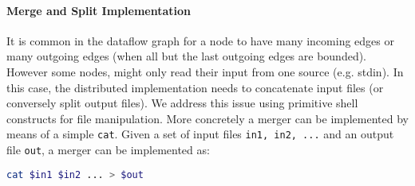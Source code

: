 \documentclass[acmsmall,10pt,review,anonymous]{acmart}
\newcommand{\ttt}[1]{\texttt{\small #1}}
\newcommand{\nv}[1]{[{\color{cyan}#1 --- nv}]}
\newcommand{\kk}[1]{[{\color{magenta}#1 --- kk}]}
\newcommand{\tr}[1]{} %
\begin{document}
% 
% 
% 
% 
% 
%

\paragraph{Merge and Split Implementation}
%
It is common in the dataflow graph for a node to have many incoming
edges or many outgoing edges (when all but the last outgoing edges
are bounded). However some nodes, might only read their input from one
source (e.g. stdin). In this case, the distributed implementation
needs to concatenate input files (or conversely split output
files).
%
%
We address this issue using primitive shell constructs for file
manipulation. More concretely a merger can be implemented by means of a simple
\ttt{cat}. Given a set of input files \ttt{in1, in2, ...} and an
output file \ttt{out}, a merger can be implemented as:

\begin{lstlisting}[language=sh, float=h, numbers=none]
 cat $in1 $in2 ... > $out
\end{lstlisting}
\end{document}
